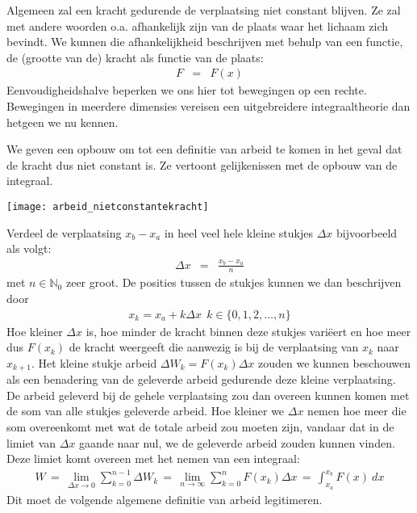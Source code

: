\documentclass{ximera}
\begin{document}
	\author{Bart Lambregs}
    \xmsource






	Algemeen zal een kracht gedurende de verplaatsing niet constant blijven. Ze zal met andere woorden o.a. afhankelijk zijn van de plaats waar het lichaam zich bevindt. We kunnen die afhankelijkheid beschrijven met behulp van een functie, de (grootte van de) kracht
	als functie van de plaats:
	\begin{eqnarray*}
	F&=&F(x)
	\end{eqnarray*}
	Eenvoudigheidshalve beperken we ons hier tot bewegingen op een rechte. Bewegingen in meerdere dimensies vereisen een uitgebreidere integraaltheorie dan hetgeen we nu kennen.
	
	We geven een opbouw om tot een definitie van arbeid te komen in het geval dat de kracht dus niet constant is. Ze vertoont gelijkenissen met de opbouw van de integraal.
	\begin{image}
	
	\texttt{[image: arbeid\_nietconstantekracht]}
	\end{image}
	
	Verdeel de verplaatsing $x_b-x_a$ in heel veel hele kleine stukjes $\Delta x$ bijvoorbeeld als volgt:
	\begin{eqnarray*}
	\Delta x&=&\frac{x_b-x_a}{n}
	\end{eqnarray*}
	met $n\in\mathbb{N}_0$ zeer groot. De posities tussen de stukjes kunnen we dan be\-schrij\-ven door
	\begin{eqnarray*}
	x_k=x_a+k\Delta x\ \ k\in\{0,1,2,\ldots,n\}
	\end{eqnarray*}
	Hoe kleiner $\Delta x$ is, hoe minder de kracht binnen deze stukjes vari\"eert en hoe meer dus $F(x_k)$ de kracht weergeeft die aanwezig is bij de verplaatsing van $x_{k}$ naar $x_{k+1}$. Het kleine stukje arbeid $\Delta W_k=F(x_k)\Delta x$ zouden we kunnen beschouwen als
	een benadering van de geleverde arbeid gedurende deze kleine verplaatsing. De arbeid geleverd bij de gehele verplaatsing zou dan overeen kunnen komen met de som van alle stukjes geleverde arbeid. Hoe kleiner we $\Delta x$ nemen hoe meer die som overeenkomt met wat de totale arbeid zou moeten zijn, vandaar dat in de limiet van $\Delta x$ gaande naar nul, we de geleverde arbeid zouden kunnen vinden. Deze limiet komt overeen met het nemen van een integraal:
	\begin{eqnarray*}
	W\,=\,\lim_{\Delta x\rightarrow0}\sum_{k=0}^{n-1}\Delta W_k
	\,=\,\lim_{n\rightarrow\infty}\sum_{k=0}^{n}F(x_k)\Delta x
	\,=\,\int_{x_a}^{x_b}F(x)~dx
	\end{eqnarray*}
	Dit moet de volgende algemene definitie van arbeid legitimeren.
	
\end{document}
